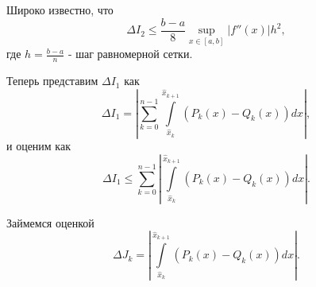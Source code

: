 \documentclass[10pt, twocolumn]{article}
\begin{document}
Широко известно, что
\begin{equation} \label{eq:i2_error}
  \Delta I_2 \leq \frac{b - a}{8} \sup \limits_{x \in [a, b]} \left| f''(x) \right| h^2,
\end{equation}
где $h = \frac{b - a}{n}$ - шаг равномерной сетки.

Теперь представим $\Delta I_1$ как
\begin{equation*}
  \Delta I_1 = \left| \sum \limits_{k = 0}^{n - 1} \int \limits_{\hat{x}_k}^{\hat{x}_{k + 1}} (P_k(x) - Q_k(x)) dx \right|,
\end{equation*}
и оценим как
\begin{equation} \label{eq:di1}
  \Delta I_1 \leq \sum \limits_{k = 0}^{n - 1} \left| \int \limits_{\hat{x}_k}^{\hat{x}_{k + 1}} (P_k(x) - Q_k(x)) dx \right|.
\end{equation}

Займемся оценкой
\begin{equation} \label{eq:djk}
  \Delta J_k = \left| \int \limits_{\hat{x}_k}^{\hat{x}_{k + 1}} (P_k(x) - Q_k(x)) dx \right|.
\end{equation}
\end{document}
